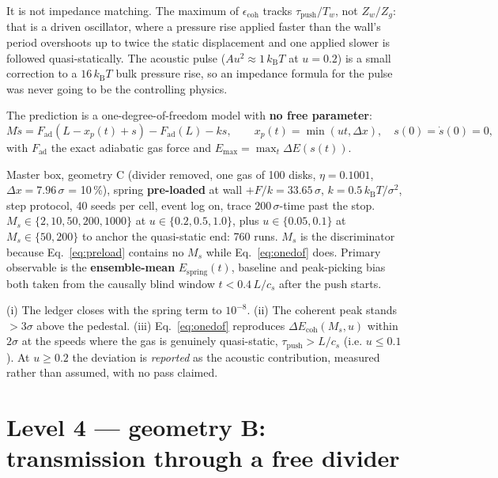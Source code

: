 \documentclass[11pt,a4paper]{article}
\newcommand{\kT}{k_{\mathrm B}T}
\begin{document}
It is not impedance matching. The maximum of $\epsilon_{\mathrm{coh}}$ tracks
$\tau_{\mathrm{push}}/T_w$, not $Z_w/Z_g$: that is a driven oscillator, where a pressure rise
applied faster than the wall's period overshoots up to twice the static displacement and one applied
slower is followed quasi-statically. The acoustic pulse ($Au^2 \approx 1\,\kT$ at $u = 0.2$) is a
small correction to a $16\,\kT$ bulk pressure rise, so an impedance formula for the pulse was never
going to be the controlling physics.

The prediction is a one-degree-of-freedom model with \textbf{no free parameter}:
\begin{equation}
M \ddot s = F_{\mathrm{ad}}(L - x_p(t) + s) - F_{\mathrm{ad}}(L) - k s , \qquad
x_p(t) = \min(u t, \Delta x), \quad s(0) = \dot s(0) = 0,
\label{eq:onedof}
\end{equation}
with $F_{\mathrm{ad}}$ the exact adiabatic gas force and $E_{\mathrm{max}} = \max_t \Delta E(s(t))$.

\begin{run}
Master box, geometry C (divider removed, one gas of 100 disks, $\eta = 0.1001$,
$\Delta x = 7.96\,\sigma$ = 10\,\%), spring \textbf{pre-loaded} at wall $+ F/k = 33.65\,\sigma$,
$k = 0.5\,\kT/\sigma^2$, step protocol, 40 seeds per cell, event log on, trace $200\,\sigma$-time
past the stop. $M_s \in \{2,10,50,200,1000\}$ at $u \in \{0.2, 0.5, 1.0\}$, plus $u \in \{0.05,0.1\}$
at $M_s \in \{50,200\}$ to anchor the quasi-static end: 760 runs.
$M_s$ is the discriminator because Eq.~\eqref{eq:preload} contains no $M_s$ while
Eq.~\eqref{eq:onedof} does.
Primary observable is the \textbf{ensemble-mean} $E_{\mathrm{spring}}(t)$, baseline and
peak-picking bias both taken from the causally blind window $t < 0.4\,L/c_s$ after the push starts.
\end{run}
\begin{pass}
(i) The ledger closes with the spring term to $10^{-8}$.
(ii) The coherent peak stands $>3\sigma$ above the pedestal.
(iii) Eq.~\eqref{eq:onedof} reproduces $\Delta E_{\mathrm{coh}}(M_s, u)$ within $2\sigma$ at the
speeds where the gas is genuinely quasi-static, $\tau_{\mathrm{push}} > L/c_s$ (i.e. $u \le 0.1$).
At $u \ge 0.2$ the deviation is \emph{reported} as the acoustic contribution, measured rather than
assumed, with no pass claimed.
\end{pass}
\section{Level 4 --- geometry B: transmission through a free divider}
\end{document}
